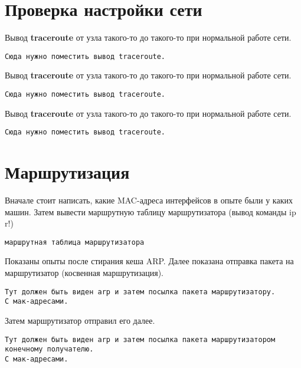 \documentclass[a4paper,12pt]{article}
\begin{document}

\section{Проверка настройки сети}

Вывод \textbf{traceroute} от узла такого-то до такого-то при нормальной работе сети.

\begin{Verbatim}
Сюда нужно поместить вывод traceroute.
\end{Verbatim}

Вывод \textbf{traceroute} от узла такого-то до такого-то при нормальной работе сети.

\begin{Verbatim}
Сюда нужно поместить вывод traceroute.
\end{Verbatim}

Вывод \textbf{traceroute} от узла такого-то до такого-то при нормальной работе сети.

\begin{Verbatim}
Сюда нужно поместить вывод traceroute.
\end{Verbatim}


\section{Маршрутизация}


Вначале стоит написать, какие MAC-адреса интерфейсов в опыте были у каких машин.
Затем вывести маршрутную таблицу маршрутизатора (вывод команды ip r!)

\begin{Verbatim}
маршрутная таблица маршрутизатора
\end{Verbatim}

Показаны опыты после стирания кеша ARP.
Далее показана отправка пакета на маршрутизатор (косвенная маршрутизация). 

\begin{Verbatim}
Тут должен быть виден arp и затем посылка пакета маршрутизатору. 
С мак-адресами.
\end{Verbatim}

Затем маршрутизатор отправил его далее.

\begin{Verbatim}
Тут должен быть виден arp и затем посылка пакета маршрутизатором конечному получателю. 
С мак-адресами.
\end{Verbatim}
\end{document}
